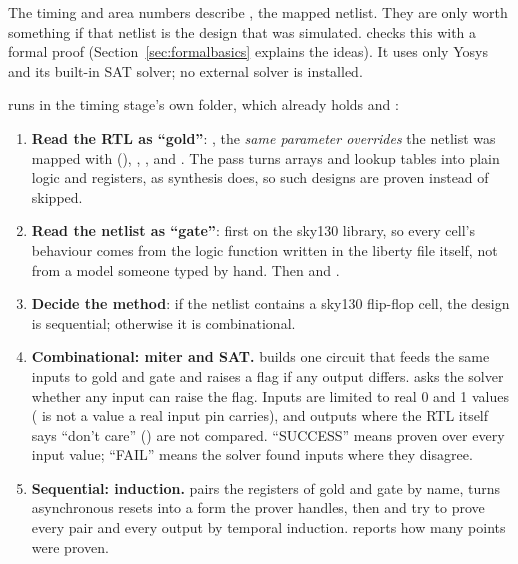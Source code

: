 The timing and area numbers describe , the mapped netlist. They are only worth something if that netlist is the design that was simulated.  checks this with a formal proof (Section~\ref{sec:formalbasics} explains the ideas). It uses only Yosys and its built-in SAT solver; no external solver is installed.

 runs in the timing stage's own folder, which already holds  and :
\begin{enumerate}
  \item \textbf{Read the RTL as ``gold''}: , the \emph{same parameter overrides} the netlist was mapped with (), , , and . The  pass turns arrays and lookup tables into plain logic and registers, as synthesis does, so such designs are proven instead of skipped.
  \item \textbf{Read the netlist as ``gate''}: first  on the sky130 library, so every cell's behaviour comes from the logic function written in the liberty file itself, not from a model someone typed by hand. Then  and .
  \item \textbf{Decide the method}: if the netlist contains a sky130 flip-flop cell, the design is sequential; otherwise it is combinational.
  \item \textbf{Combinational: miter and SAT.}  builds one circuit that feeds the same inputs to gold and gate and raises a flag if any output differs.  asks the solver whether any input can raise the flag. Inputs are limited to real 0 and 1 values ( is not a value a real input pin carries), and outputs where the RTL itself says ``don't care'' () are not compared. ``SUCCESS'' means proven over every input value; ``FAIL'' means the solver found inputs where they disagree.
  \item \textbf{Sequential: induction.}  pairs the registers of gold and gate by name,  turns asynchronous resets into a form the prover handles, then  and  try to prove every pair and every output by temporal induction.  reports how many points were proven.
\end{enumerate}

